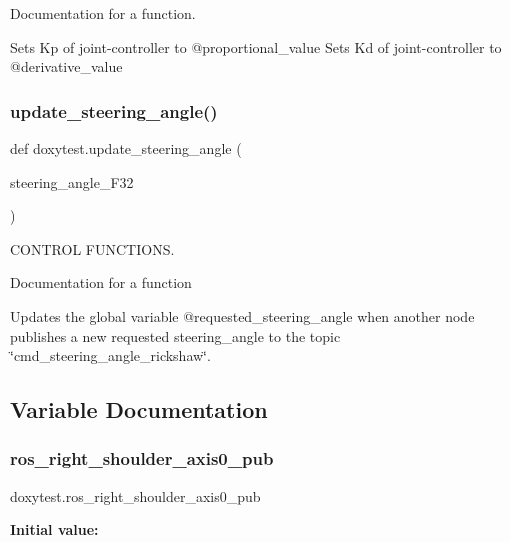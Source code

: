 Documentation for a function. 

Sets Kp of joint-\/controller to @proportional\+\_\+value Sets Kd of joint-\/controller to @derivative\+\_\+value \mbox{\label{namespacedoxytest_acd0aa7ea92003151c7287b61bd0adab1}} 
\subsubsection{\texorpdfstring{update\_steering\_angle()}{update\_steering\_angle()}}
{\footnotesize\ttfamily def doxytest.\+update\+\_\+steering\+\_\+angle (\begin{DoxyParamCaption}\item[{}]{steering\+\_\+angle\+\_\+\+F32 }\end{DoxyParamCaption})}



C\+O\+N\+T\+R\+OL F\+U\+N\+C\+T\+I\+O\+NS. 

Documentation for a function

Updates the global variable @requested\+\_\+steering\+\_\+angle when another node publishes a new requested steering\+\_\+angle to the topic \char`\"{}cmd\+\_\+steering\+\_\+angle\+\_\+rickshaw\char`\"{}. 

\subsection{Variable Documentation}
\mbox{\label{namespacedoxytest_a891796e23e8c28f6d6cb07eabe0c271b}} 
\subsubsection{\texorpdfstring{ros\_right\_shoulder\_axis0\_pub}{ros\_right\_shoulder\_axis0\_pub}}
{\footnotesize\ttfamily doxytest.\+ros\+\_\+right\+\_\+shoulder\+\_\+axis0\+\_\+pub}

{\bfseries Initial value\+:}
\begin{DoxyCode}{0}

\end{DoxyCode}
\mbox{\label{namespacedoxytest_ac97d3b49531f5d7359b288af619493e3}} 
